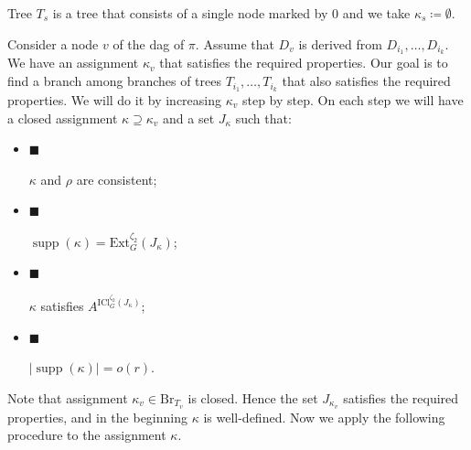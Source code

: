 Tree $T_{s}$ is a tree that consists of a single node marked by $0$ and we take $\kappa_{s}\coloneqq\emptyset$.\par




Consider a node $v$ of the dag of $\pi$. Assume that $D_{v}$ is derived from $D_{i_{1}},\dots,D_{i_{k}}$.
We have an assignment $\kappa_{v}$ that satisfies the required properties. Our goal is to find a branch
among branches of trees $T_{i_{1}},\dots,T_{i_{k}}$ that also satisfies the required properties. We will do
it by increasing $\kappa_{v}$ step by step. On each step we will have a closed assignment $\kappa\supseteq\kappa_{v}$ and a set $J_{\kappa}$ such that:\par




\begin{itemize}


\item[] 
$\blacksquare$ 


$\kappa$ and $\rho$ are consistent;\par





\item[] 
$\blacksquare$ 


$\operatorname*{supp}(\kappa)=\mathrm{Ext}_{G}^{\zeta_{2}}\left(J_{\kappa}\right)$;\par





\item[] 
$\blacksquare$ 


$\kappa$ satisfies $A^{\mathrm{ICl}_{G}^{\zeta_{2}}\left(J_{\kappa}\right)}$;\par





\item[] 
$\blacksquare$ 


$|\operatorname*{supp}(\kappa)|=o(r)$.\par





\end{itemize}




Note that assignment $\kappa_{v}\in\mathrm{Br}_{T_{v}}$ is closed. Hence the set $J_{\kappa_{v}}$ satisfies the required
properties, and in the beginning $\kappa$ is well-defined. Now we apply the following procedure to the
assignment $\kappa$.\par



